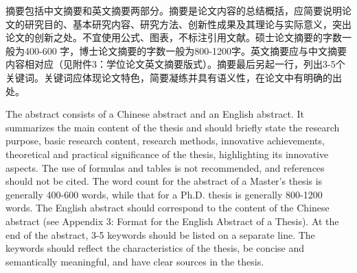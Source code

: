 \begin{cnabstract}
  摘要包括中文摘要和英文摘要两部分。摘要是论文内容的总结概括，应简要说明论文的研究目的、基本研究内容、研究方法、创新性成果及其理论与实际意义，突出论文的创新之处。不宜使用公式、图表，不标注引用文献。硕士论文摘要的字数一般为400-600 字，博士论文摘要的字数一般为800-1200字。英文摘要应与中文摘要内容相对应（见附件3：学位论文英文摘要版式）。摘要最后另起一行，列出3-5个关键词。关键词应体现论文特色，简要凝练并具有语义性，在论文中有明确的出处。
\end{cnabstract}

\begin{enabstract}
  The abstract consists of a Chinese abstract and an English abstract. It summarizes the main content of the thesis and should briefly state the research purpose, basic research content, research methods, innovative achievements, theoretical and practical significance of the thesis, highlighting its innovative aspects. The use of formulas and tables is not recommended, and references should not be cited. The word count for the abstract of a Master's thesis is generally 400-600 words, while that for a Ph.D. thesis is generally 800-1200 words. The English abstract should correspond to the content of the Chinese abstract (see Appendix 3: Format for the English Abstract of a Thesis). At the end of the abstract, 3-5 keywords should be listed on a separate line. The keywords should reflect the characteristics of the thesis, be concise and semantically meaningful, and have clear sources in the thesis.
\end{enabstract}